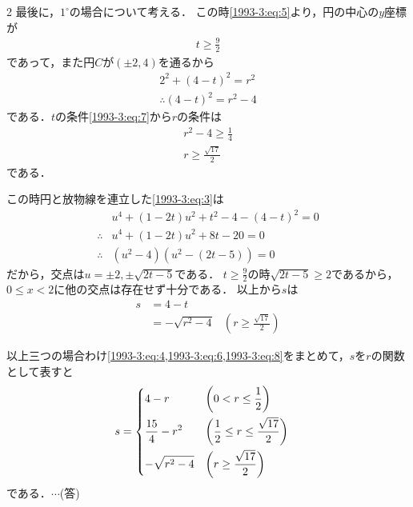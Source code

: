 \documentclass[../../../../main.tex]{subfiles}
\begin{document}
\begin{multicols}{2}
  \vspace{10pt}
  最後に，$1^{\circ}$の場合について考える．
  この時\cref{1993-3:eq:5}より，円の中心の$y$座標が
  \begin{align}
    t \ge \frac{9}{2} \label{1993-3:eq:7}
  \end{align}
  であって，また円$C$が$(\pm2, 4)$を通るから
  \begin{align*}
    2^2 + (4-t)^2 = r^2 \\
    \therefore
    (4-t)^2 = r^2 -4
  \end{align*}
  である．$t$の条件\cref{1993-3:eq:7}から$r$の条件は
  \begin{align*}
    r^2 -4 \ge \frac{1}{4} \\
    r \ge \frac{\sqrt{17}}{2}
  \end{align*}
  である．

  この時円と放物線を連立した\cref{1993-3:eq:3}は
  \begin{align*}
     & u^4 + (1-2t)u^2 + t^2 -4 - (4-t)^2 = 0 \\
    \therefore
     & u^4 + (1-2t)u^2 + 8t -20 = 0           \\
    \therefore
     & (u^2-4)\left(u^2 - (2t-5)\right) = 0
  \end{align*}
  だから，交点は$u=\pm 2, \pm\sqrt{2t-5}$である．
  $t \ge \frac{9}{2}$の時$\sqrt{2t-5}\ge 2$であるから，$0\le x <2$に他の交点は存在せず十分である．
  以上から$s$は
  \begin{align}
    s
     & = 4 - t                                                                      \\
     & = - \sqrt{r^2-4} & \left(r \ge \frac{\sqrt{17}}{2} \right) \label{1993-3:eq:8}
  \end{align}

  以上三つの場合わけ\cref{1993-3:eq:4,1993-3:eq:6,1993-3:eq:8}をまとめて，$s$を$r$の関数として表すと
  \begin{align*}
    s & =
    \begin{dcases}
      4 - r              & \left(0 < r \le \frac{1}{2}\right)                       \\
      \frac{15}{4} - r^2 & \left(\frac{1}{2} \le  r  \le \frac{\sqrt{17}}{2}\right) \\
      - \sqrt{r^2-4}     & \left(r \ge \frac{\sqrt{17}}{2} \right)
    \end{dcases}
  \end{align*}
  である．$\cdots$(答)

  \vspace{10pt}


\end{multicols}
\end{document}
